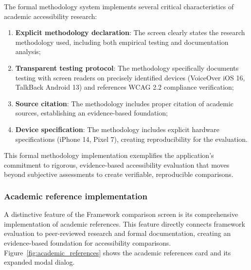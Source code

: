 \FloatBarrier

The formal methodology system implements several critical characteristics of academic accessibility research:

\begin{enumerate}
    \item \textbf{Explicit methodology declaration}: The screen clearly states the research methodology used, including both empirical testing and documentation analysis;
    
    \item \textbf{Transparent testing protocol}: The methodology specifically documents testing with screen readers on precisely identified devices (VoiceOver iOS 16, TalkBack Android 13) and references WCAG 2.2 compliance verification;
    
    \item \textbf{Source citation}: The methodology includes proper citation of academic sources, establishing an evidence-based foundation;
    
    \item \textbf{Device specification}: The methodology includes explicit hardware specifications (iPhone 14, Pixel 7), creating reproducibility for the evaluation.
\end{enumerate}

This formal methodology implementation exemplifies the application's commitment to rigorous, evidence-based accessibility evaluation that moves beyond subjective assessments to create verifiable, reproducible comparisons.

\subsubsection{Academic reference implementation}

A distinctive feature of the Framework comparison screen is its comprehensive implementation of academic references. This feature directly connects framework evaluation to peer-reviewed research and formal documentation, creating an evidence-based foundation for accessibility comparisons. Figure~\ref{fig:academic_references} shows the academic references card and its expanded modal dialog.

